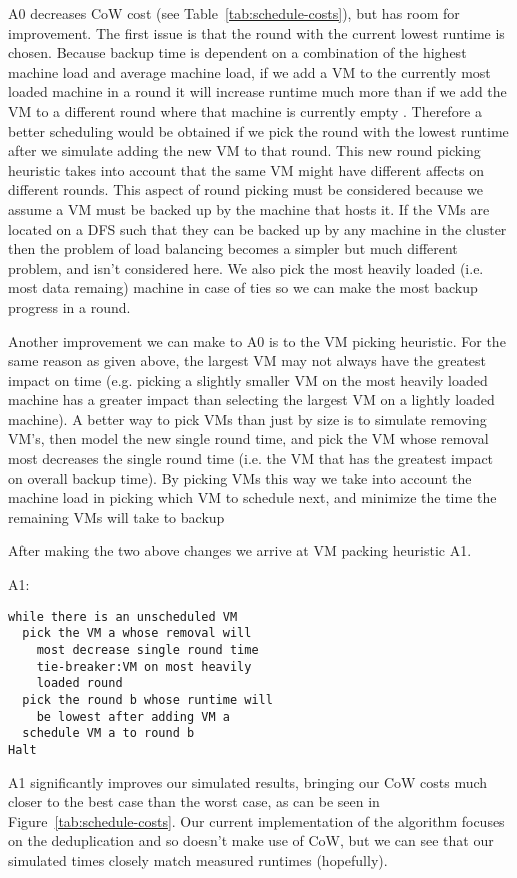 A0 decreases CoW cost (see Table~\ref{tab:schedule-costs}), but has room for
improvement. The first issue is that the round with the current lowest runtime
is chosen.  Because backup time is dependent on a combination of the highest
machine load and average machine load, if we add a VM to the currently most
loaded machine in a round it will increase runtime much more than if we add the
VM to a different round where that machine is currently empty
. Therefore a better scheduling
would be obtained if we pick the round with the lowest runtime after we
simulate adding the new VM to that round. This new round picking heuristic
takes into account that the same VM might have different affects on different
rounds. This aspect of round picking must be considered because we assume a VM
must be backed
up by the machine that hosts it. If the VMs are located on a DFS such that they
can be
backed up by any machine in the cluster then the problem of load balancing
becomes a simpler but much different problem, and isn't considered here. We
also pick the most heavily loaded (i.e. most data remaing) machine in case of
ties so we can make the most backup progress in a round.

Another improvement we can make to A0 is to the VM picking heuristic. For the
same reason as given above, the largest VM may not always have the greatest
impact on time (e.g. picking a slightly smaller VM on the most heavily loaded
machine has a greater impact than selecting the largest VM on a lightly loaded
machine). A better way to pick VMs than just by size is to simulate removing
VM's, then model the new single round time, and pick the VM whose removal most
decreases the single round time (i.e. the VM that has the greatest impact on
overall backup time). By picking VMs this way we take into account
the machine load in picking which VM to schedule next, and minimize the time
the remaining VMs will take to backup

After making the two above changes we arrive at VM packing heuristic A1.

A1:
\begin{lstlisting}
while there is an unscheduled VM
  pick the VM a whose removal will
    most decrease single round time
    tie-breaker:VM on most heavily
    loaded round
  pick the round b whose runtime will
    be lowest after adding VM a
  schedule VM a to round b
Halt
\end{lstlisting}

A1 significantly improves our simulated results, bringing our CoW costs much
closer to the best case than the worst case, as can be seen in
Figure~\ref{tab:schedule-costs}.  Our current implementation of the algorithm
focuses on the deduplication and so doesn't make use of CoW, but we can see
that our simulated times closely match measured runtimes (hopefully). 
